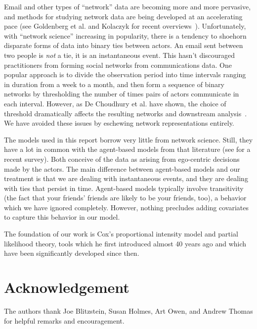 \documentclass[aoas,preprint]{imsart}
\begin{document}
Email and other types of ``network'' data are becoming more and more pervasive,
and methods for studying network data are being developed at an accelerating
pace (see Goldenberg et al. and Kolaczyk for recent
overviews~\cite{goldenberg2009survey,kolaczyk2009statistical}).  Unfortunately,
with ``network science'' increasing in popularity, there is a tendency to
shoehorn disparate forms of data into binary ties between actors.  An email
sent between two people is \emph{not} a tie, it is an instantaneous event.
This hasn't discouraged practitioners from forming social networks from
communications data.  One popular approach is to divide the observation period
into time intervals ranging in duration from a week to a month, and then form
a sequence of binary networks by thresholding the number of times pairs of actors
communicate in each interval.  However, as De Choudhury et al. have shown, the
choice of threshold dramatically affects the resulting networks and
downstream analysis~\cite{dechoudhury2010}.  We have avoided these issues by
eschewing network representations entirely.

The models used in this report borrow very little from network science.
Still, they have a lot in common with the agent-based models from that
literature (see \cite{snijders2010introduction} for a recent survey).  Both
conceive of the data as arising from ego-centric decisions made by the actors.
The main difference between agent-based models and our treatment is that we
are dealing with instantaneous events, and they are dealing with ties that
persist in time.  Agent-based models typically involve transitivity (the fact
that your friends' friends are likely to be your friends, too), a behavior
which we have ignored completely.  However, nothing precludes adding covariates
to capture this behavior in our model.

The foundation of our work is Cox's proportional intensity model and partial
likelihood theory, tools which he first introduced almost 40 years ago and which
have been significantly developed since then.



\section*{Acknowledgement}

The authors thank Joe Blitzstein, Susan Holmes, Art Owen, and Andrew Thomas
for helpful remarks and encouragement.


\appendix
\end{document}
